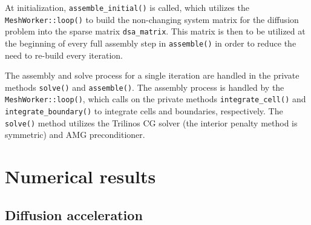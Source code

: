 \documentclass{article}
\begin{document}
At initialization, \texttt{assemble\_initial()} is called, which utilizes the \texttt{MeshWorker::loop()} to build the non-changing system matrix for the diffusion problem into the sparse matrix \texttt{dsa\_matrix}. This matrix is then to be utilized at the beginning of every full assembly step in \texttt{assemble()} in order to reduce the need to re-build every iteration.

The assembly and solve process for a single iteration are handled in the private methods \texttt{solve()} and \texttt{assemble()}. The assembly process is handled by the \texttt{MeshWorker::loop()}, which calls on the private methods \texttt{integrate\_cell()} and \texttt{integrate\_boundary()} to integrate cells and boundaries, respectively. The \texttt{solve()} method utilizes the Trilinos CG solver (the interior penalty method is symmetric) and AMG preconditioner.

\section{Numerical results}

\subsection{Diffusion acceleration}
\end{document}
